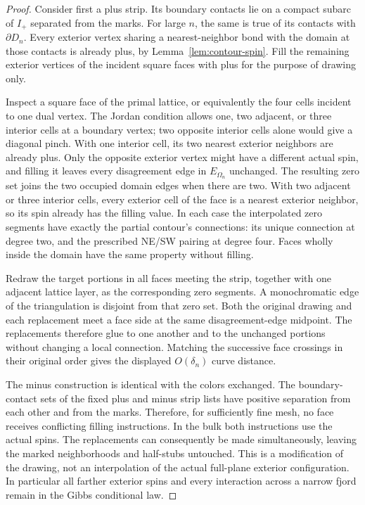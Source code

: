 \begin{proof}
Consider first a plus strip.  Its boundary contacts lie on a compact
subarc of $I_+$ separated from the marks.  For large $n$, the same is
true of its contacts with $\partial D_n$.  Every exterior vertex sharing
a nearest-neighbor bond with the domain at those contacts is already
plus, by Lemma~\ref{lem:contour-spin}.  Fill the remaining exterior
vertices of the incident square faces with plus for the purpose of
drawing only.

Inspect a square face of the primal lattice, or equivalently the four
cells incident to one dual vertex.  The Jordan condition allows one,
two adjacent, or three interior cells at a boundary vertex; two opposite
interior cells alone would give a diagonal pinch.  With one interior
cell, its two nearest exterior neighbors are already plus.  Only the
opposite exterior vertex might have a different actual spin, and filling
it leaves every disagreement edge in $E_{\Omega_n}$ unchanged.  The
resulting zero set joins the two occupied domain edges when there are
two.  With two adjacent or three interior cells, every exterior cell
of the face is a nearest exterior neighbor, so its spin already has the
filling value.  In each case the interpolated zero segments have exactly
the partial contour's connections: its unique connection at degree two,
and the prescribed NE/SW pairing at degree four.  Faces wholly inside
the domain have the same property without filling.

Redraw the target portions in all faces meeting the strip, together
with one adjacent lattice layer, as the corresponding zero segments.
A monochromatic edge of the triangulation is disjoint from that zero
set.  Both the original drawing and each replacement meet a face side
at the same disagreement-edge midpoint.  The replacements therefore
glue to one another and to the unchanged portions without changing a
local connection.  Matching the successive face crossings in their
original order gives the displayed $O(\delta_n)$ curve distance.

The minus construction is identical with the colors exchanged.  The
boundary-contact sets of the fixed plus and minus strip lists have
positive separation from each other and from the marks.  Therefore,
for sufficiently fine mesh, no face receives conflicting filling
instructions.  In the bulk both instructions use the actual spins.
The replacements can consequently be made simultaneously, leaving the
marked neighborhoods and half-stubs untouched.  This is a modification
of the drawing, not an interpolation of the actual full-plane exterior
configuration.  In particular all farther exterior spins and every
interaction across a narrow fjord remain in the Gibbs conditional law.
\end{proof}

